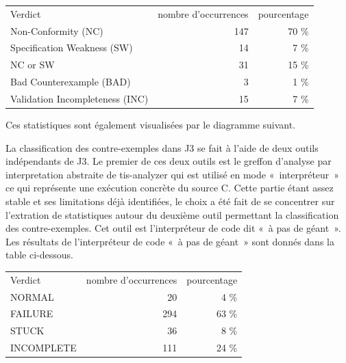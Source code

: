 \documentclass[a4paper,11pt]{article}
\begin{document}
\begin{center}
  \begin{tabular}{|l|r|r|}
    \hline
  \rowcolor{gray!50} Verdict
  & \multicolumn{1}{p{0.13\textwidth}|}{nombre d'occurrences}
  & \multicolumn{1}{p{0.13\textwidth}|}{pourcentage}
  \\
Non-Conformity (NC)                 & 147 & 70 \% \\
Specification Weakness (SW)         &  14 &  7 \% \\
NC or SW  	                        &  31 & 15 \% \\
Bad Counterexample (BAD)            &   3 &  1 \% \\
    Validation Incompleteness (INC) &  15 &  7 \% \\
    \hline
  \end{tabular}
\end{center}
Ces statistiques sont également visualisées par le diagramme
suivant.
  \begin{center}
\end{center}

La classification des contre-exemples dans J3 se fait à l'aide de deux outils
indépendants de J3. Le premier de ces deux outils est le greffon d'analyse par
interpretation abstraite de tis-analyzer qui est utilisé en mode «~interpréteur~»
ce qui représente une exécution concrète du source C. Cette partie étant assez
stable et ses limitations déjà identifiées, le choix a été fait de se concentrer
sur l'extration de statistiques autour du deuxième outil permettant la
classification des contre-exemples. Cet outil est l'interpréteur de code dit
«~à pas de géant~». Les résultats de l'interpréteur de code «~à pas de géant~»
sont donnés dans la table ci-dessous.

\begin{center}
  \begin{tabular}{|l|r|r|}
    \hline
  \rowcolor{gray!50} Verdict
  & \multicolumn{1}{p{0.13\textwidth}|}{nombre d'occurrences}
  & \multicolumn{1}{p{0.13\textwidth}|}{pourcentage}
  \\
    NORMAL                              &  20 &  4 \% \\
    FAILURE                             & 294 & 63 \% \\
    STUCK                               &  36 &  8 \% \\
    INCOMPLETE                          & 111 & 24 \% \\
    \hline
  \end{tabular}
\end{center}
\end{document}
